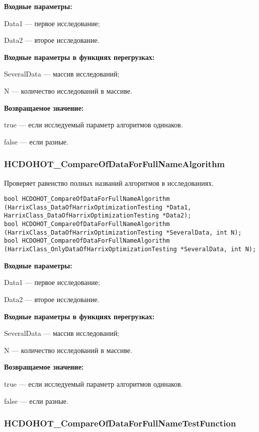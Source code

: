\documentclass[a4paper,12pt]{article}
\begin{document}
\textbf{Входные параметры:}

Data1 --- первое исследование;
 
Data2 --- второе исследование.
	 
\textbf{Входные параметры в функциях перегрузках:}

SeveralData --- массив исследований;
 
N --- количество исследований в массиве.

\textbf{Возвращаемое значение:}

true --- если исследуемый параметр алгоритмов одинаков.
 
false --- если разные.


\subsubsection{HCDOHOT\_CompareOfDataForFullNameAlgorithm}\label{HCDOHOT_CompareOfDataForFullNameAlgorithm}

Проверяет равенство полных названий алгоритмов в исследованиях.


\begin{lstlisting}[label=code_syntax_HCDOHOT_CompareOfDataForFullNameAlgorithm,caption=Синтаксис]
bool HCDOHOT_CompareOfDataForFullNameAlgorithm (HarrixClass_DataOfHarrixOptimizationTesting *Data1, HarrixClass_DataOfHarrixOptimizationTesting *Data2);
bool HCDOHOT_CompareOfDataForFullNameAlgorithm (HarrixClass_DataOfHarrixOptimizationTesting *SeveralData, int N);
bool HCDOHOT_CompareOfDataForFullNameAlgorithm (HarrixClass_OnlyDataOfHarrixOptimizationTesting *SeveralData, int N);
\end{lstlisting}

\textbf{Входные параметры:}

Data1 --- первое исследование;
 
Data2 --- второе исследование.
	 
\textbf{Входные параметры в функциях перегрузках:}

SeveralData --- массив исследований;
 
N --- количество исследований в массиве.

\textbf{Возвращаемое значение:}

true --- если исследуемый параметр алгоритмов одинаков.
 
false --- если разные.


\subsubsection{HCDOHOT\_CompareOfDataForFullNameTestFunction}\label{HCDOHOT_CompareOfDataForFullNameTestFunction}
\end{document}
